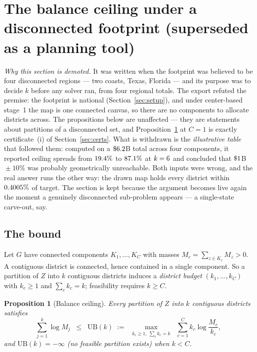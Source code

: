 \documentclass[11pt]{article}
\newtheorem{prop}{Proposition}
\theoremstyle{definition}
\begin{document}
\section{The balance ceiling under a disconnected footprint
(superseded as a planning tool)}\label{sec:ceiling}

\emph{Why this section is demoted.} It was written when the footprint was believed to be four
disconnected regions --- two coasts, Texas, Florida --- and its purpose was to decide $k$
before any solver ran, from four regional totals. The export refuted the premise: the
footprint is national (Section~\ref{sec:setup}), and under center-based stage~1 the map is
one connected canvas, so there are no components to allocate districts across. The
propositions below are unaffected --- they are statements about partitions of a disconnected
set, and Proposition~\ref{prop:ceiling} at $C=1$ is exactly certificate~(i) of
Section~\ref{sec:certs}. What is withdrawn is the \emph{illustrative table} that followed
them: computed on a $\$6.2$B total across four components, it reported ceiling
spreads from $19.4\%$ to $87.1\%$ at $k=6$ and concluded that
$\$1$B${}\pm10\%$ was probably geometrically unreachable. Both inputs were wrong,
and the real answer runs the other way: the drawn map holds every district within
$0.4005\%$ of target. The section is kept because the argument becomes live again the
moment a genuinely disconnected sub-problem appears --- a single-state carve-out, say.

\subsection{The bound}

Let $G$ have connected components $K_1,\dots,K_C$ with masses
$M_c=\sum_{z\in K_c}M_z>0$. A contiguous district is connected, hence contained in a single
component. So a partition of $Z$ into $k$ contiguous districts induces a
\emph{district budget} $(k_1,\dots,k_C)$ with $k_c\ge1$ and $\sum_c k_c=k$; feasibility
requires $k\ge C$.

\begin{prop}[Balance ceiling]\label{prop:ceiling}
Every partition of $Z$ into $k$ contiguous districts satisfies
\begin{equation}\label{eq:ceiling}
\sum_{j=1}^{k}\log M_j \;\;\le\;\; \mathrm{UB}(k) \;:=\;
\max_{\substack{k_c\ge1,\ \sum_c k_c=k}} \;\sum_{c=1}^{C} k_c\log\frac{M_c}{k_c},
\end{equation}
and $\mathrm{UB}(k)=-\infty$ (no feasible partition exists) when $k<C$.
\end{prop}
\end{document}
